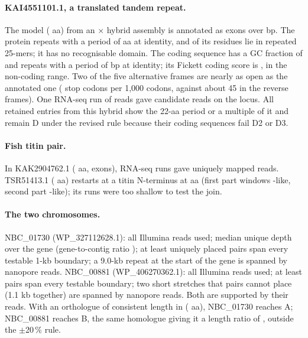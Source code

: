\documentclass[11pt]{article}
\begin{document}
\paragraph{KAI4551101.1, a translated tandem repeat.} The model ( aa) from an 
$\times$  hybrid assembly is annotated as  exons over  bp. The
protein repeats with a period of  aa at  identity, and
 of its residues lie in repeated 25-mers; it has no recognisable domain. The coding sequence has a GC
fraction of  and repeats with a period of  bp at 
identity; its Fickett coding score is , in the non-coding range. Two of the five alternative frames
are nearly as open as the annotated one ( stop codons per 1,000 codons, against
about 45 in the reverse frames). One RNA-seq run of  reads gave  candidate reads
on the locus. All  retained entries from this hybrid show the 22-aa period or a multiple of it and remain D
under the revised rule because their coding sequences fail D2 or D3.

\paragraph{Fish titin pair.} In KAK2904762.1 ( aa,  exons), 
RNA-seq runs gave  uniquely mapped reads. TSR51413.1 ( aa) restarts at a titin
N-terminus at aa  (first part  windows -like, second
part  -like); its  runs were too shallow to test the join.

\paragraph{The two  chromosomes.} NBC\_01730 (WP\_327112628.1): all  Illumina reads
used; median unique depth over the gene  (gene-to-contig ratio ); at least
 uniquely placed pairs span every testable 1-kb boundary; a 9.0-kb repeat at the start of
the gene is spanned by  nanopore reads. NBC\_00881 (WP\_406270362.1): all
 Illumina reads used; at least  pairs span every testable boundary;
two short stretches that pairs cannot place (1.1 kb together) are spanned by  nanopore
reads. Both are supported by their reads. With an orthologue of consistent length in 
( aa), NBC\_01730 reaches A; NBC\_00881 reaches B, the same homologue giving it a length ratio of
, outside the $\pm$20\,\% rule.
\end{document}
